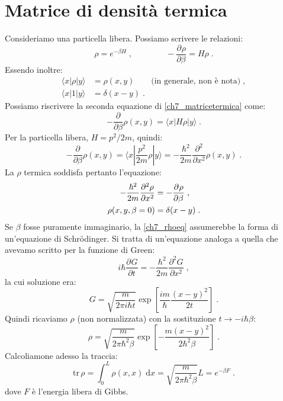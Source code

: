 \documentclass[10pt,a4paper]{report}
\theoremstyle{definition}
\newcommand{\pdev}[3][]{\frac{\partial^{#1} #2}{\partial #3^{#1}}}
\numberwithin{equation}{section}
\newcommand{\diff}[1][]{\mathrm{d}#1}
\newcommand{\bra}{\langle}
\newcommand{\ket}{\rangle}
\newcommand{\Sch}{Schrödinger}
\newcommand{\tr}{\mathrm{tr}}
\begin{document}
\section{Matrice di densità termica}
Consideriamo una particella libera. Possiamo scrivere le relazioni:
\begin{equation}
\rho=e^{-\beta H}\;, \qquad \qquad -\pdev{\rho}{\beta}=H\rho\;. \label{ch7_matricetermica}
\end{equation}
Essendo inoltre:
\begin{align*}
\bra x|\rho|y\ket &= \rho(x,y)\qquad\mbox{(in generale, non è nota)}\;, \\
\bra x|1|y\ket &= \delta(x-y)\;.
\end{align*}
Possiamo riscrivere la seconda equazione di \eqref{ch7_matricetermica} come:
\begin{equation}
-\frac{\partial}{\partial\beta}\rho(x,y)=\bra x|H\rho|y\ket\;.
\end{equation}
Per la particella libera, $H=p^2/2m$, quindi:
\begin{equation}
-\frac{\partial}{\partial\beta}\rho(x,y)=\bra x|\frac{p^2}{2m}\rho|y\ket=-\frac{\hbar^2}{2m}\frac{\partial^2}{\partial x^2}\rho(x,y)\;.
\end{equation}
La $\rho$ termica soddisfa pertanto l'equazione:
\begin{align}
-\frac{\hbar^2}{2m}\pdev[2]{\rho}{x} &= -\pdev{\rho}{\beta}\;, \notag \\
\rho(x,y,\beta=0)&=\delta(x-y)\;. \label{ch7_rhoeq}
\end{align}
Se $\beta$ fosse puramente immaginario, la \eqref{ch7_rhoeq} assumerebbe la forma di un'equazione di \Sch. Si tratta di un'equazione analoga a quella che avevamo scritto per la funzione di Green:
\begin{equation}
i\hbar\pdev{G}{t}=-\frac{\hbar^2}{2m}\pdev[2]{G}{x}\;,
\end{equation}
la cui soluzione era:
\begin{equation}
G=\sqrt{\frac{m}{2\pi i\hbar t}}\exp\left[\frac{im}{\hbar}\frac{(x-y)^2}{2t}\right]\;.
\end{equation}
Quindi ricaviamo $\rho$ (non normalizzata) con la sostituzione $t\to -i\hbar\beta$:
\begin{equation}
\rho=\sqrt{\frac{m}{2\pi\hbar^2\beta}}\exp\left[-\frac{m(x-y)^2}{2\hbar^2\beta}\right]\;.
\end{equation}
Calcoliamone adesso la traccia:
\begin{equation}
\tr\,\rho=\int_0^L \rho(x,x)\;\diff{x}=\sqrt{\frac{m}{2\pi\hbar^2\beta}}L=e^{-\beta F}\;.
\end{equation}
dove $F$ è l'energia libera di Gibbs.
\end{document}
